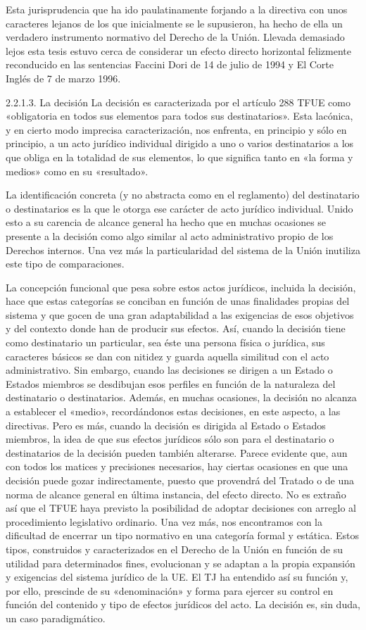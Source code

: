 \documentclass[10pt,a4paper]{article}
\begin{document}
Esta jurisprudencia que ha ido paulatinamente forjando a la directiva con unos caracteres lejanos de los que inicialmente se le supusieron, ha hecho de ella un verdadero instrumento normativo del Derecho de la Unión. Llevada demasiado lejos esta tesis estuvo cerca de considerar un efecto directo horizontal felizmente reconducido en las sentencias Faccini Dori de 14 de julio de 1994 y El Corte Inglés de 7 de marzo 1996.

2.2.1.3. La decisión
La decisión es caracterizada por el artículo 288 TFUE como «obligatoria en todos sus elementos para todos sus destinatarios». Esta lacónica, y en cierto modo imprecisa caracterización, nos enfrenta, en principio y sólo en principio, a un acto jurídico individual dirigido a uno o varios destinatarios a los que obliga en la totalidad de sus elementos, lo que significa tanto en «la forma y medios» como en su «resultado».

La identificación concreta (y no abstracta como en el reglamento) del destinatario o destinatarios es la que le otorga ese carácter de acto jurídico individual. Unido esto a su carencia de alcance general ha hecho que en muchas ocasiones se presente a la decisión como algo similar al acto administrativo propio de los Derechos internos. Una vez más la particularidad del sistema de la Unión inutiliza este tipo de comparaciones.

La concepción funcional que pesa sobre estos actos jurídicos, incluida la decisión, hace que estas categorías se conciban en función de unas finalidades propias del sistema y que gocen de una gran adaptabilidad a las exigencias de esos objetivos y del contexto donde han de producir sus efectos. Así, cuando la decisión tiene como destinatario un particular, sea éste una persona física o jurídica, sus caracteres básicos se dan con nitidez y guarda aquella similitud con el acto administrativo. Sin embargo, cuando las decisiones se dirigen a un Estado o Estados miembros se desdibujan esos perfiles en función de la naturaleza del destinatario o destinatarios. Además, en muchas ocasiones, la decisión no alcanza a establecer el «medio», recordándonos estas decisiones, en este aspecto, a las directivas. Pero es más, cuando la decisión es dirigida al Estado o Estados miembros, la idea de que sus efectos jurídicos sólo son para el destinatario o destinatarios de la decisión pueden también alterarse. Parece evidente que, aun con todos los matices y precisiones necesarios, hay ciertas ocasiones en que una decisión puede gozar indirectamente, puesto que provendrá del Tratado o de una norma de alcance general en última instancia, del efecto directo. No es extraño así que el TFUE haya previsto la posibilidad de adoptar decisiones con arreglo al procedimiento legislativo ordinario. Una vez más, nos encontramos con la dificultad de encerrar un tipo normativo en una categoría formal y estática. Estos tipos, construidos y caracterizados en el Derecho de la Unión en función de su utilidad para determinados fines, evolucionan y se adaptan a la propia expansión y exigencias del sistema jurídico de la UE. El TJ ha entendido así su función y, por ello, prescinde de su «denominación» y forma para ejercer su control en función del contenido y tipo de efectos jurídicos del acto. La decisión es, sin duda, un caso paradigmático.
\end{document}
